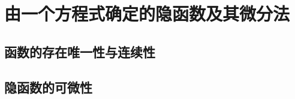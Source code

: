 \section{由一个方程式确定的隐函数及其微分法}
\subsection{函数的存在唯一性与连续性}
\subsection{隐函数的可微性}
\begin{exercise}
\item
\end{exercise}
\begin{exercise*}
\item
\end{exercise*}




\endinput
